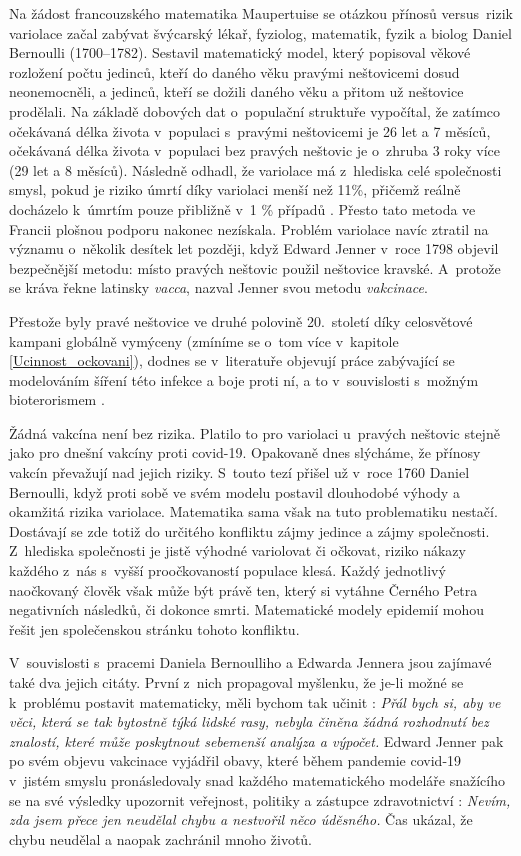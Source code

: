 Na žádost francouzského matematika Maupertuise se otázkou přínosů versus\ rizik variolace začal zabývat švýcarský lékař, fyziolog, matematik, fyzik a biolog Daniel Bernoulli (1700--1782). Sestavil matematický model, který popisoval věkové rozložení počtu jedinců, kteří do daného věku pravými neštovicemi dosud neonemocněli, a jedinců, kteří se dožili daného věku a přitom už neštovice prodělali. Na základě dobových dat o~populační struktuře vypočítal, že zatímco očekávaná délka života v~populaci s~pravými neštovicemi je 26 let a 7 měsíců, očekávaná délka života v~populaci bez pravých neštovic je o~zhruba 3 roky více (29 let a 8 měsíců). Následně odhadl, že variolace má z~hlediska celé společnosti smysl, pokud je riziko úmrtí díky variolaci menší než 11\%, přičemž reálně docházelo k~úmrtím pouze přibližně v~1 \% případů \cite{Bacaer2011}. Přesto tato metoda ve Francii plošnou podporu nakonec nezískala. Problém variolace navíc ztratil na významu o~několik desítek let později, když Edward Jenner v~roce 1798 objevil bezpečnější metodu: místo pravých neštovic použil neštovice kravské. A~protože se kráva řekne latinsky \emph{vacca}, nazval Jenner svou metodu \emph{vakcinace}. 

Přestože byly pravé neštovice ve druhé polovině 20.\ století díky celosvětové kampani globálně vymýceny (zmíníme se o~tom více v~kapitole \ref{Ucinnost_ockovani}), dodnes se v~literatuře objevují práce zabývající se modelováním šíření této infekce a boje proti ní, a to v~souvislosti s~možným bioterorismem \cite{Bozzette_etal2003,Longini_etal2007}.

Žádná vakcína není bez rizika. Platilo to pro variolaci u~pravých neštovic stejně jako pro dnešní vakcíny proti covid-19. Opakovaně dnes slýcháme, že přínosy vakcín převažují nad jejich riziky. S~touto tezí přišel už v~roce 1760 Daniel Bernoulli, když proti sobě ve svém modelu postavil dlouhodobé výhody a okamžitá rizika variolace. Matematika sama však na tuto problematiku nestačí. Dostávají se zde totiž do určitého konfliktu zájmy jedince a zájmy společnosti. Z~hlediska společnosti je jistě výhodné variolovat či očkovat, riziko nákazy každého z~nás s~vyšší proočkovaností populace klesá. Každý jednotlivý naočkovaný člověk však může být právě ten, který si vytáhne Černého Petra negativních následků, či dokonce smrti. Matematické modely epidemií mohou řešit jen společenskou stránku tohoto konfliktu.

V~souvislosti s~pracemi Daniela Bernoulliho a Edwarda Jennera jsou zajímavé také dva jejich citáty. První z~nich propagoval myšlenku, že je-li možné se k~problému postavit matematicky, měli bychom tak učinit \cite{Bacaer2011}: \emph{Přál bych si, aby ve věci, která se tak bytostně týká lidské rasy, nebyla činěna žádná rozhodnutí bez znalostí, které může poskytnout sebemenší analýza a výpočet.} Edward Jenner pak po svém objevu vakcinace vyjádřil obavy, které během pandemie covid-19 v~jistém smyslu pronásledovaly snad každého matematického modeláře snažícího se na své výsledky upozornit veřejnost, politiky a zástupce zdravotnictví \cite{JennerCitat}: \emph{Nevím, zda jsem přece jen neudělal chybu a nestvořil něco úděsného.} Čas ukázal, že chybu neudělal a naopak zachránil mnoho životů.

